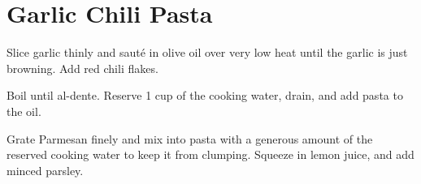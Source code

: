 
\section{Garlic Chili Pasta}
\begin{recipe}



Slice garlic thinly and sauté in olive oil over very low heat until the garlic is just browning. Add red chili flakes.


Boil until al-dente. Reserve 1 cup of the cooking water, drain, and add pasta to the oil.



Grate Parmesan finely and mix into pasta with a generous amount of the reserved cooking water to keep it from clumping. Squeeze in lemon juice, and add minced parsley.

\end{recipe}

